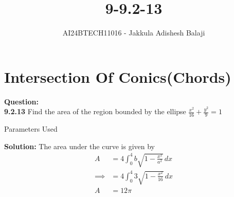 \documentclass[journal]{IEEEtran}
\begin{document}

\setlength{\intextsep}{10pt} %

\title{9-9.2-13}
\author{AI24BTECH11016 - Jakkula Adishesh Balaji}
\maketitle
\section*{\textbf{Intersection Of Conics(Chords)}}
\parindent 0pt
\textbf{Question:} \\
\textbf{9.2.13} Find the area of the region bounded by the ellipse $\frac{x^{2}}{16} + \frac{y^{2}}{9} = 1$\\
\begin{table}[h!]    	
    \centering
     
    \caption{Parameters Used}
    \label{tab:1-1.9-6}
\end{table}
\textbf{Solution:}
The area under the curve is given by \\
\begin{align}
A &= 4 \int_0^4 b \sqrt{1 - \frac{x^2}{a^2}} \, dx \\
\implies &= 4 \int_0^4 3 \sqrt{1 - \frac{x^2}{16}} \, dx \\
A &= 12\pi
\end{align}
\end{document}
